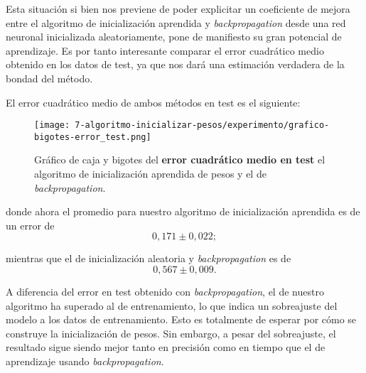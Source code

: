 Esta situación si bien nos previene de poder explicitar un coeficiente de mejora 
entre el algoritmo de inicialización aprendida y \textit{backpropagation} desde 
una red neuronal inicializada aleatoriamente, pone de manifiesto su gran potencial de aprendizaje. 
Es por tanto interesante  comparar el error cuadrático medio obtenido en los datos de test, ya que nos dará una estimación verdadera de la bondad del método.  

El error cuadrático medio de ambos métodos en test es el siguiente: 
\begin{figure}[H]
    \centering
     \texttt{[image: 7-algoritmo-inicializar-pesos/experimento/grafico-bigotes-error\_test.png]}
     \caption{Gráfico de caja y bigotes del \textbf{error cuadrático medio en test } el algoritmo de inicialización aprendida de pesos y el de \textit{backpropagation}.}
     \label{img07:error-test}
\end{figure}

donde ahora el promedio para nuestro algoritmo de inicialización aprendida es de un error de
\begin{equation}
    0,171 \pm 0,022;
\end{equation}

mientras que el de inicialización aleatoria y \textit{backpropagation} es de 
\begin{equation}
    0,567 \pm 0,009.
\end{equation}


A diferencia del error en test obtenido con \textit{backpropagation}, el de nuestro algoritmo
 ha superado al de entrenamiento, lo que indica un sobreajuste 
del modelo a los datos de entrenamiento. Esto es totalmente de esperar por 
cómo se construye la inicialización de pesos. Sin embargo, a pesar del sobreajuste, el resultado sigue siendo mejor tanto en precisión como en tiempo que el de aprendizaje usando \textit{backpropagation}.  


